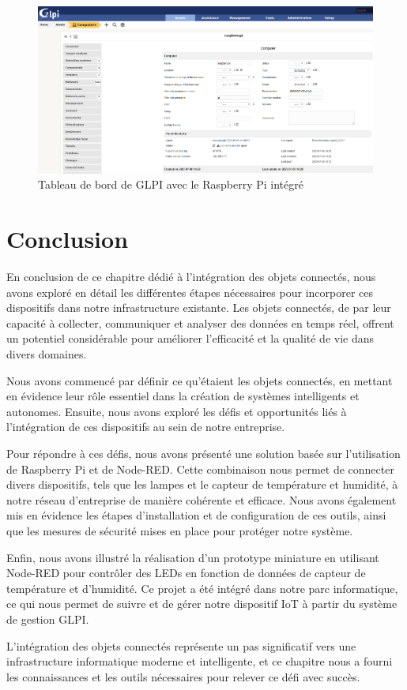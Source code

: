 \begin{figure}[H]
\centering
\includegraphics[width=16.5cm]{Images/RASPBERRYPIGLPI.png}
\caption{Tableau de bord de GLPI avec le Raspberry Pi intégré}
\label{fig:glpi-raspberry}
\end{figure}

\bigskip

\section{Conclusion}

En conclusion de ce chapitre dédié à l'intégration des objets connectés, nous avons exploré en détail les différentes étapes nécessaires pour incorporer ces dispositifs dans notre infrastructure existante. Les objets connectés, de par leur capacité à collecter, communiquer et analyser des données en temps réel, offrent un potentiel considérable pour améliorer l'efficacité et la qualité de vie dans divers domaines.

Nous avons commencé par définir ce qu'étaient les objets connectés, en mettant en évidence leur rôle essentiel dans la création de systèmes intelligents et autonomes. Ensuite, nous avons exploré les défis et opportunités liés à l'intégration de ces dispositifs au sein de notre entreprise.

Pour répondre à ces défis, nous avons présenté une solution basée sur l'utilisation de Raspberry Pi et de Node-RED. Cette combinaison nous permet de connecter divers dispositifs, tels que les lampes et le capteur de température et humidité, à notre réseau d'entreprise de manière cohérente et efficace. Nous avons également mis en évidence les étapes d'installation et de configuration de ces outils, ainsi que les mesures de sécurité mises en place pour protéger notre système.

Enfin, nous avons illustré la réalisation d'un prototype miniature en utilisant Node-RED pour contrôler des LEDs en fonction de données de capteur de température et d'humidité. Ce projet a été intégré dans notre parc informatique, ce qui nous permet de suivre et de gérer notre dispositif IoT à partir du système de gestion GLPI.

L'intégration des objets connectés représente un pas significatif vers une infrastructure informatique moderne et intelligente, et ce chapitre nous a fourni les connaissances et les outils nécessaires pour relever ce défi avec succès.